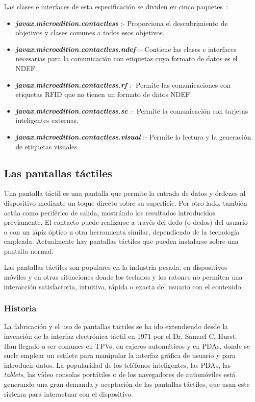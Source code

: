 \begin{itemize}
Las clases e interfaces de esta especificación se dividen en cinco
paquetes~\cite{bib:jsr257}:
\begin{itemize}
\item \emph{\textbf{javax.microedition.contactless}} :- Proporciona el 
descubrimiento de objetivos y clases comunes a todos esos objetivos.
\item \emph{\textbf{javax.microedition.contactless.ndef}} :- Contiene las 
clases e interfaces necesarias para la comunicación con etiquetas cuyo formato 
de datos es el \acs{NDEF}.
\item \emph{\textbf{javax.microedition.contactless.rf}} :- Permite las 
comunicaciones con etiquetas \acs{RFID} que no tienen un formato de datos
\acs{NDEF}.
\item \emph{\textbf{javax.microedition.contactless.sc}} :- Permite la 
comunicación con tarjetas inteligentes externas.
\item \emph{\textbf{javax.microedition.contactless.visual}} :- Permite la 
lectura y la generación de etiquetas visuales.
\end{itemize}
\end{itemize}

\subsection{Las pantallas táctiles}

Una pantalla táctil es una pantalla que permite la entrada de datos y órdenes 
al dispositivo mediante un toque directo sobre su superficie. Por otro lado, 
también actúa como periférico de salida, mostrándo los resultados introducidos 
previamente. El contacto puede realizarse a través del dedo (o dedos) del
usuario o con un lápiz óptico u otra herramienta similar, dependiendo de la 
tecnología empleada. Actualmente hay pantallas táctiles que pueden instalarse 
sobre una pantalla normal.

Las pantallas táctiles son populares en la industria pesada, en dispositivos
móviles y en otras situaciones donde los teclados y los ratones no permiten una 
interacción satisfactoria, intuitiva, rápida o exacta del usuario con el 
contenido.

  \subsubsection{Historia}
La fabricación y el uso de pantallas tactiles se ha ido extendiendo desde la 
invención de la interfaz electrónica táctil en 1971 por el Dr. Samuel C. Hurst. 
Han llegado a ser comunes en \acs{TPV}s, en cajeros automáticos y en
\acs{PDA}s, donde se suele emplear un estilete para manipular la interfaz 
gráfica de usuario y para introducir datos. La popularidad de los teléfonos 
inteligentes, las \acs{PDA}s, las \emph{tablets}, las vídeo consolas portátiles 
o de los navegadores de automóviles está generando una gran demanda y 
aceptación de las pantallas táctiles, que usan este sistema para interactuar
con el dispositivo.

